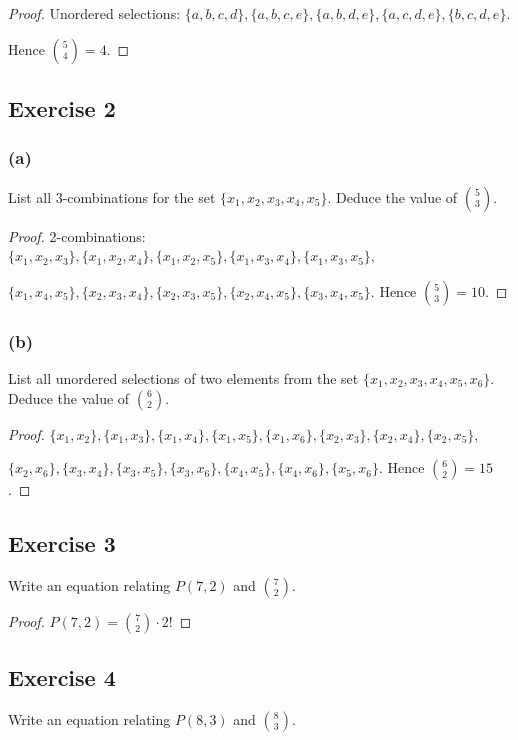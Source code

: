 \documentclass[14pt]{extarticle}
\begin{document}
\begin{proof}
     Unordered selections: \(\{a,b,c,d\}, \{a,b,c,e\}, \{a,b,d,e\}, \{a,c,d,e\}, \{b,c,d,e\}\).

     Hence \(\binom{5}{4} = 4\).
\end{proof}

\subsection{Exercise 2}
\subsubsection{(a)}
List all 3-combinations for the set \(\{x_1, x_2, x_3, x_4, x_5\}\). Deduce the value of \(\binom{5}{3}\).

\begin{proof}
     2-combinations: \(\{x_1, x_2, x_3\}, \{x_1, x_2, x_4\}, \{x_1, x_2, x_5\}, \{x_1, x_3, x_4\}, \{x_1, x_3, x_5\},\)

     \(\{x_1, x_4, x_5\}, \{x_2, x_3, x_4\}, \{x_2, x_3, x_5\}, \{x_2, x_4, x_5\}, \{x_3, x_4, x_5\}\).
     Hence \(\binom{5}{3} = 10\).
\end{proof}

\subsubsection{(b)}
List all unordered selections of two elements from the set \(\{x_1, x_2, x_3, x_4, x_5, x_6\}\).
Deduce the value of \(\binom{6}{2}\).

\begin{proof}
     \(\{x_1, x_2\}, \{x_1, x_3\}, \{x_1, x_4\}, \{x_1, x_5\}, \{x_1, x_6\}, \{x_2, x_3\}, \{x_2, x_4\}, \{x_2, x_5\}\),

     \(\{x_2, x_6\}, \{x_3, x_4\}, \{x_3, x_5\}, \{x_3, x_6\}, \{x_4, x_5\}, \{x_4, x_6\}, \{x_5, x_6\}\).
     Hence \(\binom{6}{2} = 15\).
\end{proof}

\subsection{Exercise 3}
Write an equation relating \(P(7,2)\) and \(\binom{7}{2}\).

\begin{proof}
     \(P(7,2) = \binom{7}{2} \cdot 2!\)
\end{proof}

\subsection{Exercise 4}
Write an equation relating \(P(8,3)\) and \(\binom{8}{3}\).
\end{document}
